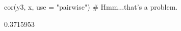 \begin{Schunk}
\begin{Sinput}
 cor(y3, x, use = "pairwise") # Hmm...that's a problem.
\end{Sinput}
\begin{Soutput}
[1] 0.3715953
\end{Soutput}
\end{Schunk}

